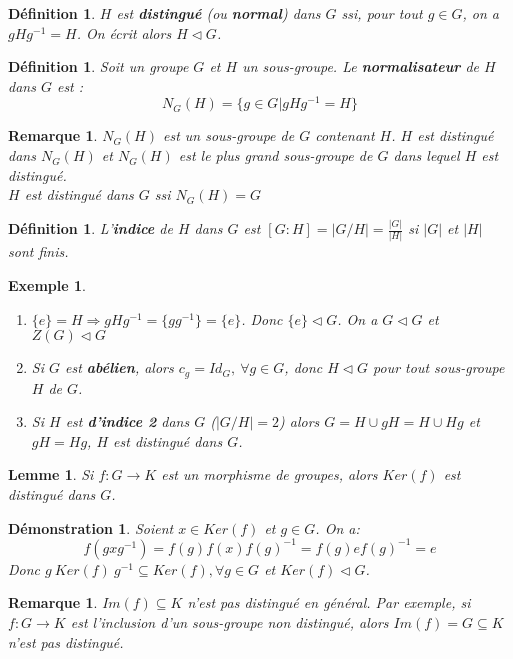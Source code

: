 \documentclass[a4paper, oneside]{report}
\theoremstyle{break}
\newtheorem{defi}[thm]{Définition}
\newtheorem{lemme}[thm]{Lemme}
\newtheorem{exem}[thm]{Exemple}
\newtheorem{remar}[thm]{Remarque}
\newtheorem*{demo}{Démonstration}
\newcommand{\sg}{sous-groupe }
\begin{document}
\begin{defi}
	$H$ est \textbf{distingué} (ou \textbf{normal}) dans $G$ ssi, pour tout $g\in G$, on a $gHg^{-1}=H$. On écrit alors $H\vartriangleleft G$.
\end{defi}

\begin{defi}
Soit un groupe $G$ et $H$ un sous-groupe. Le \textbf{normalisateur} de $H$ dans $G$ est :
$$N_G(H)=\{g\in G | gHg^{-1}=H\}$$
\end{defi}

\begin{remar}
$N_G(H)$ est un \sg de $G$ contenant $H$. $H$ est distingué dans $N_G(H)$ et $N_G(H)$ est le plus grand \sg de $G$ dans lequel $H$ est distingué.\\
$H$ est distingué dans $G$ ssi $N_G(H)=G$
\end{remar}

\begin{defi}
	L'\textbf{indice} de $H$ dans $G$ est $[G:H]=|G/H| = \displaystyle \frac{|G|}{|H|}$ si $|G|$ et $|H|$ sont finis.
\end{defi}

\begin{exem}
	\begin{enumerate}
		\item $\{e\}=H \Rightarrow gHg^{-1}=\{gg^{-1}\}=\{e\}$. Donc $\{e\}\vartriangleleft G$. On a $G\vartriangleleft G$ et $Z(G)\vartriangleleft G$
		\item Si $G$ est \textbf{abélien}, alors $c_g=Id_G,~\forall g\in G$, donc $H\vartriangleleft G$ pour tout \sg $H$ de $G$.
		\item Si $H$ est \textbf{d'indice 2} dans $G$ ($|G/H|=2$) alors $G=H\cup gH=H\cup Hg$ et $gH=Hg$, $H$ est distingué dans $G$.
	\end{enumerate}
\end{exem}

\begin{lemme}
	Si $f:G\rightarrow K$ est un morphisme de groupes, alors $Ker(f)$ est distingué dans $G$.
\end{lemme}

\begin{demo}
	Soient $x\in Ker(f)$ et $g\in G$. On a:
	$$f(gxg^{-1})=f(g)f(x)f(g)^{-1}=f(g)ef(g)^{-1}=e$$
	Donc $g~Ker(f)~g^{-1}\subseteq Ker(f),\forall g\in G$ et $Ker(f)\vartriangleleft G$.
\end{demo}

\begin{remar}
	$Im(f)\subseteq K$ n'est pas distingué en général. Par exemple, si $f:G\rightarrow K$ est l'inclusion d'un \sg non distingué, alors $Im(f)=G\subseteq K$ n'est pas distingué.
\end{remar}
\end{document}
